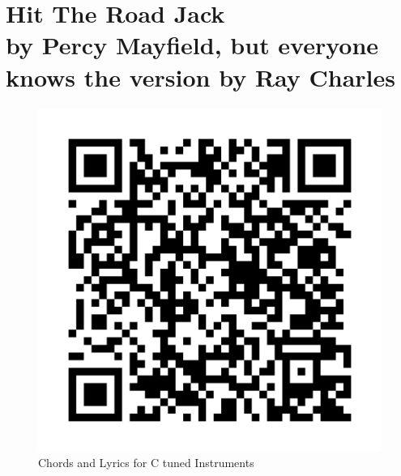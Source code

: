 \chapter[Hit The Road Jack]{Hit The Road Jack\\[1ex]\large{by Percy Mayfield, but everyone knows the version by Ray Charles}}

\begin{figure}
\includegraphics[width=1\linewidth]{QR_Codes/QR_HitTheRoadJack_Chords.png}\\
Chords and Lyrics for C tuned Instruments
\end{figure}


